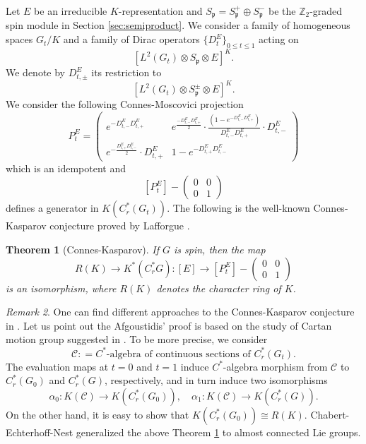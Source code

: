 \documentclass{amsproc}
\newtheorem{theorem}{Theorem}[section]
\theoremstyle{definition}
\theoremstyle{remark}
\newtheorem{remark}[theorem]{Remark}
\numberwithin{equation}{section}
\newcommand\Z{\mathbb Z}
\newcommand{\kp}{\mathfrak{p}}
\begin{document}
Let $E$ be an irreducible $K$-representation and $S_\kp = S_\kp^+ \oplus S_\kp^-$ be the $\Z_2$-graded spin module in Section \ref{sec:semiproduct}. We consider a family of homogeneous spaces $G_t/K$ and a family of Dirac operators $\{D^E_t\}_{0 \leq t \leq 1}$ acting on 
\[
\left[L^2(G_t) \otimes S_\kp \otimes E\right]^K. 
\]
We denote by $D^E_{t,\pm}$ its restriction to 
\[
\left[L^2(G_t) \otimes S^\pm_\kp \otimes E\right]^K. 
\]
We consider the following Connes-Moscovici projection \cite{connes-moscovici}
\[
P^E_t = \begin{pmatrix}
	e^{-D^{E}_{t,-}D^{E}_{t,+}} & e^{\frac{-D^{E}_{t,-}D^{E}_{t,+}}{2}} \cdot \frac{(1 - e^{-D^{E}_{t,-}D^{E}_{t,+}})}{D^{E}_{t,-}D^{E}_{t,+}} \cdot D^{E}_{t,-}\\
	e^{-\frac{D^{E}_{t,+}D^{E}_{t,-}}{2}} \cdot D^{E}_{t,+} & 1 - e^{-D^{E}_{t,+}D^{E}_{t,-}} 
\end{pmatrix}
\]
which is an idempotent and 
\[
[P^E_t] - \begin{pmatrix}
	0& 0\\
	0& 1
\end{pmatrix}
\]
defines a generator in $K\left(C_r^*(G_t) \right)$. The following is the well-known Connes-Kasparov conjecture proved by Lafforgue \cite{lafforgue}. 
\begin{theorem}[Connes-Kasparov]\label{thm:CK}
If $G$ is spin, then the map 
\[
R(K)\to K^*(C^*_rG) \colon [E] \to [P^E_t] - \begin{pmatrix} 
	0& 0\\
	0& 1
\end{pmatrix} 
\]	
is an isomorphism, where $R(K)$ denotes the character ring of $K$.  
\end{theorem}

\begin{remark}\label{rmk:CK}
One can find different approaches to the Connes-Kasparov conjecture in \cite{afgoustidis, BCH, CHST, higson-mackey, wassermann }. Let us point out the Afgoustidis' proof is based on the study of Cartan motion group suggested in \cite{BCH, higson-mackey}. To be more precise,  we consider 
\[
\mathcal{C} \colon = C^*\text{-algebra of continuous sections of $C^*_r(G_t)$}.
\]
The evaluation maps at $t = 0$ and $t = 1$ induce $C^*$-algebra morphism from $\mathcal{C}$ to $C^*_r(G_0)$ and $C^*_r(G)$, respectively, and in turn induce two isomorphisms
\[
\alpha_0 \colon K(\mathcal{C}) \to K(C^*_r(G_0)), \quad \alpha_1 \colon K(\mathcal{C}) \to K(C^*_r(G)). 
\] 	
On the other hand, it is easy to show that $ K(C^*_r(G_0)) \cong R(K)$. Chabert-Echterhoff-Nest \cite{nest} generalized the above Theorem \ref{thm:CK} to almost connected Lie groups. 
\end{remark}
\end{document}
